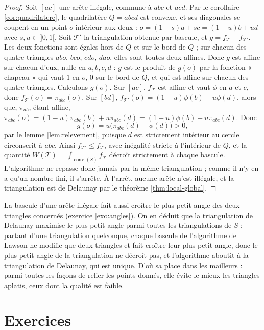 \documentclass[11pt,a4paper]{article}
\theoremstyle{plain}
\theoremstyle{definition}
\theoremstyle{remark}
\DeclareMathOperator{\conv}{conv}
\begin{document}
\begin{proof}
Soit $[ac]$ une arête illégale, commune à $abc$ et $acd$. Par le corollaire \ref{cor:quadrilatere}, le quadrilatère $Q=abcd$ est convexe, et ses diagonales se coupent en un point $o$ intérieur aux deux : $o=(1-s)a+sc=(1-u)b+ud$ avec $s,u\in\,]0,1[$. Soit $\mathcal T'$ la triangulation obtenue par bascule, et $g=f_{\mathcal T}-f_{\mathcal T'}$. Les deux fonctions sont égales hors de $Q$ et sur le bord de $Q$ ; sur chacun des quatre triangles $abo$, $bco$, $cdo$, $dao$, elles sont toutes deux affines. Donc $g$ est affine sur chacun d'eux, nulle en $a,b,c,d$ : $g$ est le produit de $g(o)$ par la fonction « chapeau » qui vaut $1$ en $o$, $0$ sur le bord de $Q$, et qui est affine sur chacun des quatre triangles. Calculons $g(o)$. Sur $[ac]$, $f_{\mathcal T}$ est affine et vaut $\phi$ en $a$ et $c$, donc $f_{\mathcal T}(o)=\pi_{abc}(o)$. Sur $[bd]$, $f_{\mathcal T'}(o)=(1-u)\phi(b)+u\phi(d)$, alors que, $\pi_{abc}$ étant affine, $\pi_{abc}(o)=(1-u)\pi_{abc}(b)+u\pi_{abc}(d)=(1-u)\phi(b)+u\pi_{abc}(d)$. Donc
\[
  g(o)=u\big(\pi_{abc}(d)-\phi(d)\big)>0,
\]
par le lemme \ref{lem:relevement}, puisque $d$ est strictement intérieur au cercle circonscrit à $abc$. Ainsi $f_{\mathcal T'}\leq f_{\mathcal T}$, avec inégalité stricte à l'intérieur de $Q$, et la quantité $W(\mathcal T)=\int_{\conv(S)}f_{\mathcal T}$ décroît strictement à chaque bascule. L'algorithme ne repasse donc jamais par la même triangulation ; comme il n'y en a qu'un nombre fini, il s'arrête. À l'arrêt, aucune arête n'est illégale, et la triangulation est de Delaunay par le théorème \ref{thm:local-global}.
\end{proof}

La bascule d'une arête illégale fait aussi croître le plus petit angle des deux triangles concernés (exercice \ref{exo:angles}). On en déduit que la triangulation de Delaunay maximise le plus petit angle parmi toutes les triangulations de $S$ \cite[chapitre 9]{deberg} : partant d'une triangulation quelconque, chaque bascule de l'algorithme de Lawson ne modifie que deux triangles et fait croître leur plus petit angle, donc le plus petit angle de la triangulation ne décroît pas, et l'algorithme aboutit à la triangulation de Delaunay, qui est unique. D'où sa place dans les mailleurs : parmi toutes les façons de relier les points donnés, elle évite le mieux les triangles aplatis, ceux dont la qualité est faible.

\section{Exercices}
\end{document}
